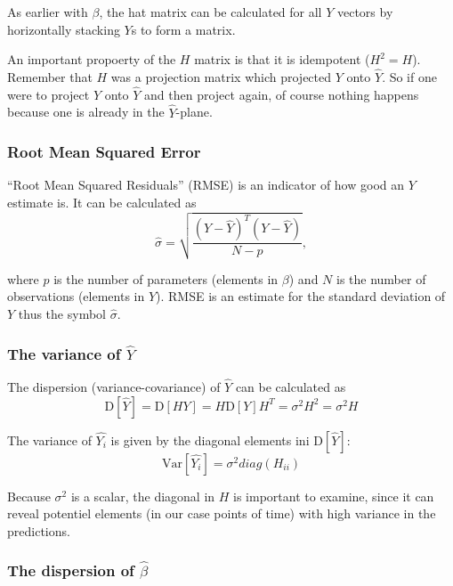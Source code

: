As earlier with $\beta$, the hat matrix can be calculated for all $Y$ vectors by horizontally stacking $Y$s to form a matrix.

An important propoerty of the $H$ matrix is that it is idempotent ($H^2 = H$).
Remember that $H$ was a projection matrix which projected $Y$ onto $\hat{Y}$.
So if one were to project $Y$ onto $\hat{Y}$ and then project again, of course nothing happens because one is already in the $\hat{Y}$-plane.

\subsubsection{Root Mean Squared Error}

``Root Mean Squared Residuals'' (RMSE) is an indicator of how good an $Y$ estimate is.
It can be calculated as
\begin{equation}
\hat{\sigma} = \sqrt{\frac{\left(Y - \hat{Y}\right)^T \left(Y - \hat{Y}\right)}{N-p}},
\end{equation}

where $p$ is the number of parameters (elements in $\beta$) and $N$ is the number of observations (elements in $Y$).
RMSE is an estimate for the standard deviation of $Y$ \cite[theorem~3.4]{time-series-analysis} thus the symbol $\hat{\sigma}$.


\subsubsection{The variance of $\hat{Y}$}

The dispersion (variance-covariance) of $\hat{Y}$ can be calculated as
\begin{equation}
\mathrm{D}[\hat{Y}] = \mathrm{D}[H Y] = H \mathrm{D}[Y] H^T = \sigma^2 H^2 = \sigma^2 H
\end{equation}

The variance of $\hat{Y_i}$ is given by the diagonal elements ini $\mathrm{D}[\hat{Y}]$:
\begin{equation}
\mathrm{Var}[\hat{Y_i}] = \sigma^2 diag(H_{ii})
\end{equation}

Because $\sigma^2$ is a scalar, the diagonal in $H$ is important to examine, since it can reveal potentiel elements (in our case points of time) with high variance in the predictions.

\subsubsection{The dispersion of $\hat{\beta}$}

